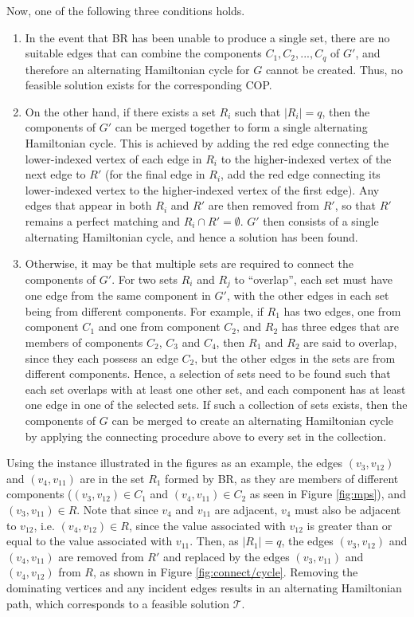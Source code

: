 \documentclass[oribibl]{llncs}
\begin{document}
Now, one of the following three conditions holds.
\begin{enumerate}
\item In the event that BR has been unable to produce a single set, there are no suitable edges that can combine the components $C_1, C_2, ..., C_q$ of $G'$, and therefore an alternating Hamiltonian cycle for $G$ cannot be created. Thus, no feasible solution exists for the corresponding COP.

\item On the other hand, if there exists a set $R_i$ such that $|R_i| = q$, then the components of $G'$ can be merged together to form a single alternating Hamiltonian cycle. This is achieved by adding the red edge connecting the lower-indexed vertex of each edge in $R_i$ to the higher-indexed vertex of the next edge to $R'$ (for the final edge in $R_i$, add the red edge connecting its lower-indexed vertex to the higher-indexed vertex of the first edge). Any edges that appear in both $R_i$ and $R'$ are then removed from $R'$, so that $R'$ remains a perfect matching and $R_i \cap R' = \emptyset$. $G'$ then consists of a single alternating Hamiltonian cycle, and hence a solution has been found.


\item Otherwise, it may be that multiple sets are required to connect the components of $G'$. For two sets $R_i$ and $R_j$ to ``overlap'', each set must have one edge from the same component in $G'$, with the other edges in each set being from different components. For example, if $R_1$ has two edges, one from component $C_1$ and one from component $C_2$, and $R_2$ has three edges that are members of components $C_2$, $C_3$ and $C_4$, then $R_1$ and $R_2$ are said to overlap, since they each possess an edge $C_2$, but the other edges in the sets are from different components. Hence, a selection of sets need to be found such that each set overlaps with at least one other set, and each component has at least one edge in one of the selected sets. If such a collection of sets exists, then the components of $G$ can be merged to create an alternating Hamiltonian cycle by applying the connecting procedure above to every set in the collection.
\end{enumerate}
Using the instance illustrated in the figures as an example, the edges $(v_3, v_{12})$ and $(v_4, v_{11})$ are in the set $R_1$ formed by BR, as they are members of different components ($(v_3, v_{12}) \in C_1$ and $(v_4, v_{11}) \in C_2$ as seen in Figure \ref{fig:mps}), and $(v_3, v_{11}) \in R$. Note that since $v_4$ and $v_{11}$ are adjacent, $v_4$ must also be adjacent to $v_{12}$, i.e. $(v_4, v_{12}) \in R$, since the value associated with $v_{12}$ is greater than or equal to the value associated with $v_{11}$. Then, as $|R_1| = q$, the edges $(v_3, v_{12})$ and $(v_4, v_{11})$ are removed from $R'$ and replaced by the edges $(v_3, v_{11})$ and $(v_4, v_{12})$ from $R$, as shown in Figure \ref{fig:connect/cycle}. Removing the dominating vertices and any incident edges results in an alternating Hamiltonian path, which corresponds to a feasible solution $\mathcal{T}$. 
\end{document}
